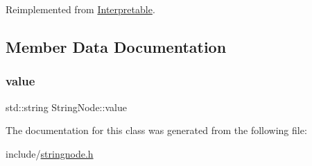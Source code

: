 Reimplemented from \hyperlink{classInterpretable_a32f547aaf68dcbab993284d3257ab010}{Interpretable}.



\subsection{Member Data Documentation}
\mbox{\label{classStringNode_a52fd9cb80da963e39d0d6d33d5396c93}} 
\subsubsection{\texorpdfstring{value}{value}}
{\footnotesize\ttfamily std\+::string String\+Node\+::value}



The documentation for this class was generated from the following file\+:\begin{DoxyCompactItemize}
\item 
include/\hyperlink{stringnode_8h}{stringnode.\+h}\end{DoxyCompactItemize}
